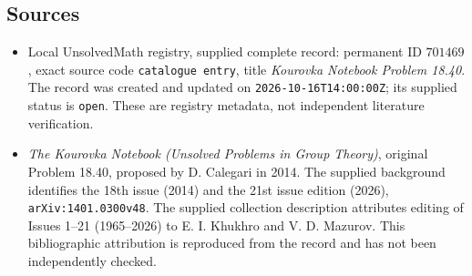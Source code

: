 \documentclass[11pt]{article}
\begin{document}
\subsection{Sources}
\begin{itemize}
\item Local UnsolvedMath registry, supplied complete record: permanent ID \(701469\), exact source code \texttt{catalogue entry}, title \emph{Kourovka Notebook Problem 18.40}. The record was created and updated on \texttt{2026-10-16T14:00:00Z}; its supplied status is \texttt{open}. These are registry metadata, not independent literature verification.
\item \emph{The Kourovka Notebook (Unsolved Problems in Group Theory)}, original Problem 18.40, proposed by D. Calegari in 2014. The supplied background identifies the 18th issue (2014) and the 21st issue edition (2026), \texttt{arXiv:1401.0300v48}. The supplied collection description attributes editing of Issues 1--21 (1965--2026) to E. I. Khukhro and V. D. Mazurov. This bibliographic attribution is reproduced from the record and has not been independently checked.
\end{itemize}
\end{document}
